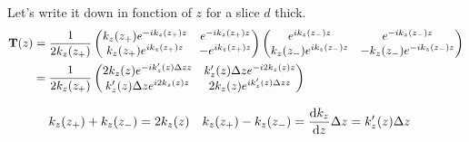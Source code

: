 Let's write it down in fonction of $z$ for a slice $d$ thick.
\begin{align*}
	\vb{T}\pqty{z} &=
	\frac{1}{2k_{z}\pqty{z_+}}\pmqty{
		k_{z}\pqty{z_+} e^{-ik_{z}\pqty{z_+}z} & 
		e^{-ik_{z}\pqty{z_+}z}  \\
		k_{z}\pqty{z_+} e^{ik_{z}\pqty{z_+}z} & 
		-e^{ik_{z}\pqty{z_+}z}
		} \pmqty{
	e^{ik_{z}\pqty{z_-}z} & 
	e^{-ik_{z}\pqty{z_-}z}  \\
	k_{z}\pqty{z_-} e^{ik_{z}\pqty{z_-}z} & 
	-k_{z}\pqty{z_-} e^{-ik_{z}\pqty{z_-}z}
	}  \\
	&= \frac{1}{2k_{z}\pqty{z_+}}\pmqty{
		2k_z\pqty{z}e^{-ik_z^\prime\pqty{z} \Delta z z} &
		k_z^\prime\pqty{z} \Delta z e^{-i2k_{z}\pqty{z}z}  \\
		k_z^\prime\pqty{z} \Delta z e^{i2k_{z}\pqty{z}z} &
		2k_z\pqty{z}e^{ik_z^\prime\pqty{z} \Delta z z}
		}
\end{align*}

\begin{align*}
	k_{z}\pqty{z_+} + k_{z}\pqty{z_-} &= 2k_z\pqty{z} & k_{z}\pqty{z_+} - k_{z}\pqty{z_-} &= \dv{k_z}{z}\Delta z = k_z^\prime\pqty{z} \Delta z 
\end{align*}

